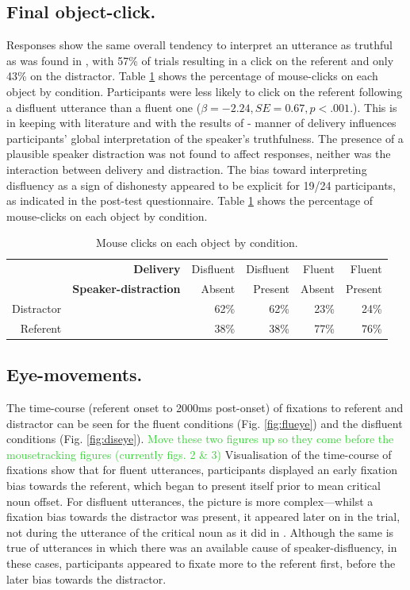 \documentclass[a4paper,man,natbib]{apa6}
\newcommand\thenote[1]{\textcolor{LimeGreen}{#1}}
\begin{document}
\subsection{Final object-click.}
Responses show the same overall tendency to interpret an utterance as truthful as was found in \citet{Loy2016}, with 57\% of trials resulting in a click on the referent and only 43\% on the distractor. 
Table \ref{table:objctclck} shows the percentage of mouse-clicks on each object by condition.
Participants were less likely to click on the referent following a disfluent utterance than a fluent one ($\beta = -2.24,SE = 0.67,p<.001.$). 
This is in keeping with literature \citep{Brennan1995, Swerts2005} and with the results of \citet{Loy2016} - manner of delivery influences participants' global interpretation of the speaker's truthfulness. 
The presence of a plausible speaker distraction was not found to affect responses, neither was the interaction between delivery and distraction. 
The bias toward interpreting disfluency as a sign of dishonesty appeared to be explicit for 19/24 participants, as indicated in the post-test questionnaire. 
Table \ref{table:objctclck} shows the percentage of mouse-clicks on each object by condition.\\

\begin{table}[ht]
\centering
\begin{tabular}{rrrrrr}
  \hline
& \textbf{Delivery} & Disfluent & Disfluent & Fluent & Fluent \\ 
& \textbf{Speaker-distraction} & Absent & Present & Absent & Present \\
  \hline
Distractor & &  62\% &  62\% &  23\% &  24\% \\ 
  Referent & &  38\% &  38\% &  77\% &  76\% \\ 
   \hline
\end{tabular}
\caption{Mouse clicks on each object by condition.}
\label{table:objctclck}
\end{table}

\subsection{Eye-movements.}

The time-course (referent onset to 2000ms post-onset) of fixations to referent and distractor can be seen for the fluent conditions (Fig. \ref{fig:flueye}) and the disfluent conditions (Fig. \ref{fig:diseye}). 
\thenote{Move these two figures up so they come before the mousetracking figures (currently figs. 2 \& 3)}
Visualisation of the time-course of fixations show that for fluent utterances, participants displayed an early fixation bias towards the referent, which began to present itself prior to mean critical noun offset. 
For disfluent utterances, the picture is more complex---whilst a fixation bias towards the distractor was present, it appeared later on in the trial, not during the utterance of the critical noun as it did in \citet{Loy2016}. 
Although the same is true of utterances in which there was an available cause of speaker-disfluency, in these cases, participants appeared to fixate more to the referent first, before the later bias towards the distractor.\\
\end{document}
